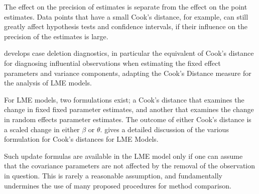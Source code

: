 \documentclass[12pt, a4paper]{report}
\theoremstyle{definition}
\theoremstyle{remark}
\begin{document}
The effect on the precision of estimates is separate from the effect on the point estimates. Data points that have a small Cook's distance, for example, can still greatly affect hypothesis tests and confidence intervals, if their  influence on the precision of the estimates is large.

\citet{Christensen} develops  case deletion diagnostics, in particular the equivalent of  Cook's distance for diagnosing influential observations when estimating the fixed effect parameters and variance components, adapting the Cook's Distance measure for the analysis of LME models. 

For LME models, two formulations exist; a Cook's distance that examines the change in fixed fixed parameter estimates, and another that examines the change in random effects parameter estimates. The outcome of either Cook's distance is a scaled change in either $\beta$ or $\theta$. \citet{Zewotir} gives a detailed discussion of the various formulation for Cook's distances for LME Models.

Such update formulas are available in the LME model only if one can assume that the covariance parameters are not affected by the removal of the observation in question. This is rarely a reasonable assumption, and fundamentally undermines the use of many proposed procedures for method comparison.


%


\end{document}
